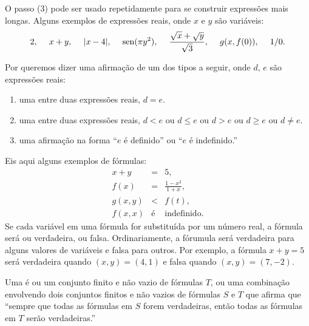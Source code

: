 O passo (3) pode ser usado repetidamente para se construir expressões
mais longas. Alguns exemplos de expressões reais, onde $x$ e $y$ são
variáveis:
\[
2, \hspace{3ex} x+y, \hspace{3ex} |x-4|, \hspace{3ex} \operatorname{sen}(\pi y^2),
\hspace{3ex} \frac{\sqrt{x} + \sqrt{y}}{\sqrt{3}}, \hspace{3ex} g(x, f(0)),
\hspace{3ex} 1/0.
\]

Por  queremos dizer uma afirmação de um dos tipos a seguir,
onde $d$, $e$ são expressões reais:
\begin{enumerate}[(1)]
\item uma  entre duas expressões reais, $d = e$.
\item uma  entre duas expressões reais, $d < e$ ou
      $d \le e$ ou $d > e$ ou $d \ge e$ ou $d \ne e$.
\item uma afirmação na forma ``$e$ é definido'' ou ``$e$ é indefinido.''
\end{enumerate}
Eis aqui alguns exemplos de fórmulas:
\begin{eqnarray*}
  x + y & = & 5, \\
  f(x)  & = & \frac{1 - x^2}{1 + x}, \\
 g(x, y) & < & f(t), \\
 f(x, x) & \text{é} & \text{indefinido}.
\end{eqnarray*}
Se cada variável em uma fórmula for substituída por um número real, a
fórmula será ou verdadeira, ou falsa. Ordinariamente, a fórumula será
verdadeira para alguns valores de variáveis e falsa para outros. Por
exemplo, a fórmula $x+y = 5$ será verdadeira quando $(x, y) = (4, 1)$
e falsa quando $(x, y) = (7, -2)$.

\begin{defin}
Uma 
é ou um conjunto finito e não vazio
de fórmulas $T$, ou uma combinação envolvendo dois conjuntos finitos e
não vazios de fórmulas $S$ e $T$ que afirma que ``sempre que todas as
fórmulas em $S$ forem verdadeiras, então todas as fórmulas em $T$ serão
verdadeiras.''
\end{defin}

